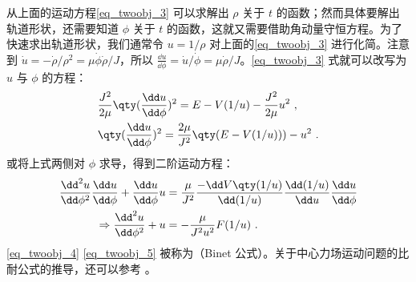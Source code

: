 从上面的运动方程\autoref{eq_twoobj_3} 可以求解出 $\rho$ 关于 $t$ 的函数；然而具体要解出轨道形状，还需要知道 $\phi$ 关于 $t$ 的函数，这就又需要借助角动量守恒方程。为了快速求出轨道形状，我们通常令 $u=1/\rho$ 对上面的\autoref{eq_twoobj_3} 进行化简。注意到 $\dot u=-\dot \rho/\rho^2=\mu\dot \phi\dot \rho/J$，所以 $\frac{\dd u}{\dd \phi}=\dot u/\dot \phi=\mu\dot \rho/J$。\autoref{eq_twoobj_3} 式就可以改写为 $u$ 与 $\phi$ 的方程：
\begin{equation}\label{eq_twoobj_4}
\begin{aligned}
&\frac{J^2}{2\mu} \qty(\frac{\dd u}{\dd \phi})^2=E-V(1/u)-\frac{J^2}{2\mu} u^2~,\\
&\qty(\frac{\dd u}{\dd \phi})^2=\frac{2\mu}{J^2}\qty(E-V(1/u)))-u^2~.
\end{aligned}
\end{equation}
或将上式两侧对 $\phi$ 求导，得到二阶运动方程：
\begin{equation}\label{eq_twoobj_5}
\begin{aligned}
\frac{{\dd}^2 u}{\dd \phi^2}\frac{\dd u}{\dd \phi}+\frac{\dd u}{\dd \phi}u&=\frac{\mu}{J^2}\frac{-\dd V\qty(1/u)}{\dd (1/u)}\frac{\dd (1/u)}{\dd u}\frac{\dd u}{\dd \phi}
\\
\Rightarrow 
\frac{{\dd}^2 u}{\dd \phi^2}+u&=-\frac{\mu}{J^2u^2}F(1/u)~.
\end{aligned}
\end{equation}
\autoref{eq_twoobj_4} \autoref{eq_twoobj_5} 被称为（Binet 公式）。关于中心力场运动问题的比耐公式的推导，还可以参考 \upref{}。

